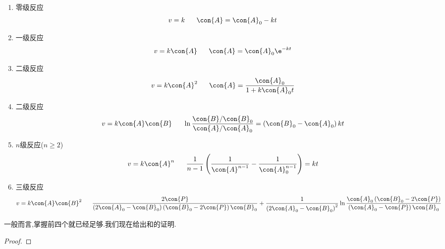 \documentclass{ctexart}
\begin{document}
\begin{theorem}[7B.2.1 积分速率方程表]
    \begin{enumerate}[topsep=0pt,parsep=0pt,itemsep=0pt,partopsep=0pt,label=\tbf{\arabic*.}]
        \item 零级反应
            \[v=k\ \ \ \ \ \con{A}=\con{A}_0-kt\]
        \item 一级反应
            \[v=k\con{A}\ \ \ \ \ \con{A}=\con{A}_0\e^{-kt}\]
        \item 二级反应
            \[v=k\con{A}^2\ \ \ \ \ \con{A}=\dfrac{\con{A}_0}{1+k\con{A}_0t}\]
        \item 二级反应
            \[v=k\con{A}\con{B}\ \ \ \ \ \ln\dfrac{\con{B}/\con{B}_0}{\con{A}/\con{A}_0}=\left(\con{B}_0-\con{A}_0\right)kt\]
        \item $n$级反应($n\geqslant2$)
            \[v=k\con{A}^n\ \ \ \ \ \dfrac{1}{n-1}\left(\dfrac{1}{\con{A}^{n-1}}-\dfrac{1}{\con{A}_0^{n-1}}\right)=kt\]
        \item 三级反应
            \[v=k\con{A}\con{B}^2\ \ \ \ \ 
            \dfrac{2\con{P}}{\left(2\con{A}_0-\con{B}_0\right)\left(\con{B}_0-2\con{P}\right)\con{B}_0}
            +\dfrac{1}{\left(2\con{A}_0-\con{B}_0\right)^2}\ln\dfrac{\con{A}_0\left(\con{B}_0-2\con{P}\right)}
            {\left(\con{A}_0-\con{P}\right)\con{B}_0}\]
        
    \end{enumerate}
\end{theorem}
一般而言,掌握前四个就已经足够.我们现在给出和的证明.
\begin{proof}
    
\end{proof}
\end{document}
